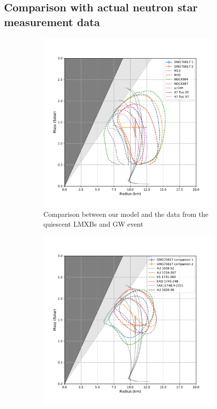 \documentclass[draft,11pt]{article}
\theoremstyle{definition}
\theoremstyle{remark}
\begin{document}
        \subsection{Comparison with actual neutron star measurement data}
            \begin{figure}[h]\begin{center}
                \begin{subfigure}[b]{.49\textwidth}
                    \includegraphics[width=\textwidth]{eos_compare_obsv1_GW}
                    \caption{Comparison between our model and the data from the quiescent LMXBs and GW event}\label{fig/quiescent.LMXB}
                \end{subfigure}
                \begin{subfigure}[b]{.49\textwidth}
                    \includegraphics[width=\textwidth]{eos_compare_obsv2_GW}

\end{subfigure}
\end{center}
\end{figure}
\end{document}
